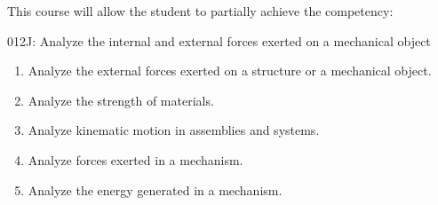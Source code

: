 {This course will allow the student to partially achieve the competency:

012J: Analyze the internal and external forces exerted on a mechanical object
\begin{enumerate}
	\item Analyze the external forces exerted on a structure or a mechanical object.
	\item Analyze the strength of materials.
	\item Analyze kinematic motion in assemblies and systems.
	\item Analyze forces exerted in a mechanism.
	\item Analyze the energy generated in a mechanism.
\end{enumerate}
}
